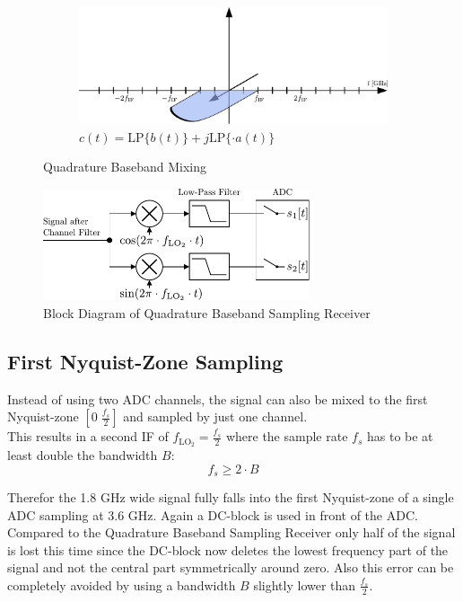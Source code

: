 \begin{figure}[p]
\begin{subfigure}{0.45\textwidth}
    \centering
    \includegraphics[width=\textwidth]{figures/rx_adc_1_freq_c}
    \caption{$c(t) = \text{LP}\{b(t)\} + j \text{LP}\{\cdot a(t)\}$}
    \label{fig:rx_adc_1_freq_c}
  \end{subfigure}
  \caption{Quadrature Baseband Mixing}
  \label{fig:rx_adc_1_freq}
\end{figure}

\begin{figure}[p]
  \centering
  \includegraphics[width=0.7\textwidth]{figures/rx_adc_1_bd}
  \caption{Block Diagram of Quadrature Baseband Sampling Receiver}
  \label{fig:rx_adc_1_bd}
\end{figure}

\subsection{First Nyquist-Zone Sampling}
\label{sec:rx_adc_0}
Instead of using two \gls{ADC} channels, the signal can also be mixed
to the first Nyquist-zone $[0 \; \frac{f_s}{2}]$ and sampled by just one
channel. \\

This results in a second \gls{IF} of $f_{\text{LO}_2} = \frac{f_s}{2}$ where
the sample rate $f_s$ has to be at least double the bandwidth $B$:
\[f_s \geq 2 \cdot B\]

Therefor the 1.8 GHz wide signal fully falls into the first Nyquist-zone of
a single \gls{ADC} sampling at 3.6 GHz. Again a \gls{DC}-block
is used in front of the \gls{ADC}. Compared to the Quadrature Baseband
Sampling Receiver only half of the signal is lost this time since
the \gls{DC}-block now deletes the lowest frequency part of the signal
and not the central part symmetrically around zero. Also this error
can be completely avoided by using a bandwidth $B$ slightly lower than
$\frac{f_s}{2}$. \\

